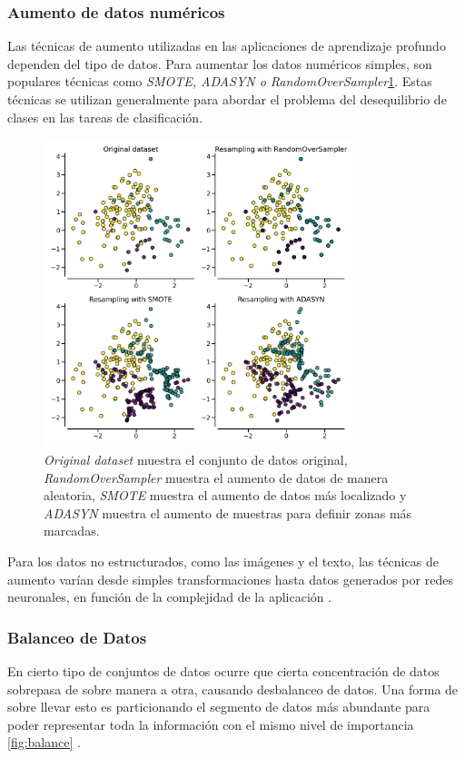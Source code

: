 \documentclass[letter,12pt]{report}
\begin{document}
\subsubsection{Aumento de datos numéricos}
Las técnicas de aumento utilizadas \cite{Augment2} en las aplicaciones de aprendizaje
profundo dependen del tipo de datos. Para aumentar los datos numéricos simples, son
populares técnicas como \textit{SMOTE, ADASYN o RandomOverSampler}\ref{fig:smote}. Estas
técnicas se utilizan generalmente para abordar el problema del desequilibrio de clases en
las tareas de clasificación. 

\begin{figure}[H]
    \centering
    \includegraphics[width=0.8\textwidth]{smote}
    \caption{\textit{Original dataset} muestra el conjunto de datos original,
        \textit{RandomOverSampler} muestra el aumento de datos de manera aleatoria,
        \textit{SMOTE} muestra el aumento de datos más localizado y \textit{ADASYN} muestra el
    aumento de muestras para definir zonas más marcadas.}
    \label{fig:smote}
\end{figure}

Para los datos no estructurados, como las imágenes y el texto, las técnicas de aumento
varían desde simples transformaciones hasta datos generados por redes neuronales, en
función de la complejidad de la aplicación \cite{Augment3}.

\subsubsection{Balanceo de Datos}
En cierto tipo de conjuntos de datos ocurre que cierta concentración de datos sobrepasa
de sobre manera a otra, causando desbalanceo de datos. Una forma de sobre llevar esto es
particionando el segmento de datos más abundante para poder representar toda la
información con el mismo nivel de importancia \ref{fig:balance} \cite{Balan}.
\end{document}
